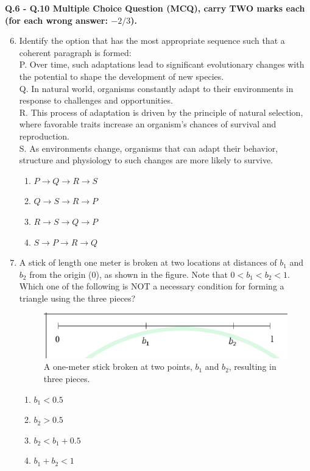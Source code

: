 \documentclass[journal]{IEEEtran}
\begin{document}
\textbf{Q.6 - Q.10 Multiple Choice Question (MCQ), carry TWO marks each (for each wrong answer: $-2/3$).}
 
\begin{enumerate}
    \setcounter{enumi}{5}
    \item Identify the option that has the most appropriate sequence such that a coherent paragraph is formed:
    \\
    P. Over time, such adaptations lead to significant evolutionary changes with the potential to shape the development of new species.
\\
    Q. In natural world, organisms constantly adapt to their environments in response to challenges and opportunities.
\\
    R. This process of adaptation is driven by the principle of natural selection, where favorable traits increase an organism's chances of survival and reproduction.
\\
    S. As environments change, organisms that can adapt their behavior, structure and physiology to such changes are more likely to survive.
\begin{multicols}{2}
    \begin{enumerate}
        \item $P \rightarrow Q \rightarrow R \rightarrow S$
        \item $Q \rightarrow S \rightarrow R \rightarrow P$
        \item $R \rightarrow S \rightarrow Q \rightarrow P$
        \item $S \rightarrow P \rightarrow R \rightarrow Q$
    \end{enumerate}
    \end{multicols}

    \item A stick of length one meter is broken at two locations at distances of $b_{1}$ and $b_{2}$ from the origin ($0$), as shown 
in the figure. Note that $0 < b_{1} < b_{2} < 1$.
Which one of the following is NOT a necessary condition for forming a triangle using the three pieces?
\begin{figure}[!h]
        \centering
        \includegraphics[width=0.3\columnwidth]{figs/Q.7.png}
        \caption{A one-meter stick broken at two points, $b_1$ and $b_2$, resulting in three pieces.}
        \label{fig:Q.7}
    \end{figure}
    \begin{multicols}{2}
    \begin{enumerate}
        \item $b_{1} < 0.5$
        \item $b_{2} > 0.5$
        \item $b_{2} < b_{1} + 0.5$
        \item $b_{1} + b_{2} < 1$
    \end{enumerate}
    \end{multicols}


\end{enumerate}
\end{document}
